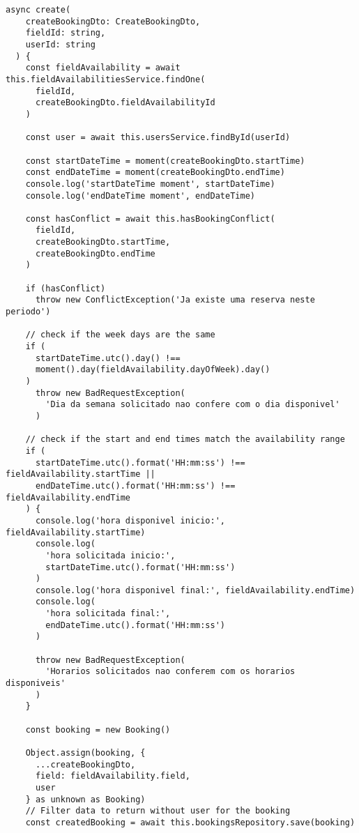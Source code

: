 \begin{lstlisting}[caption={\textit{Service} para a rota de criação de \textit{booking} (agendamento).},label={cod:create-booking-service}]
	async create(
    createBookingDto: CreateBookingDto,
    fieldId: string,
    userId: string
  ) {
    const fieldAvailability = await this.fieldAvailabilitiesService.findOne(
      fieldId,
      createBookingDto.fieldAvailabilityId
    )

    const user = await this.usersService.findById(userId)

    const startDateTime = moment(createBookingDto.startTime)
    const endDateTime = moment(createBookingDto.endTime)
    console.log('startDateTime moment', startDateTime)
    console.log('endDateTime moment', endDateTime)

    const hasConflict = await this.hasBookingConflict(
      fieldId,
      createBookingDto.startTime,
      createBookingDto.endTime
    )

    if (hasConflict)
      throw new ConflictException('Ja existe uma reserva neste periodo')

    // check if the week days are the same
    if (
      startDateTime.utc().day() !==
      moment().day(fieldAvailability.dayOfWeek).day()
    )
      throw new BadRequestException(
        'Dia da semana solicitado nao confere com o dia disponivel'
      )

    // check if the start and end times match the availability range
    if (
      startDateTime.utc().format('HH:mm:ss') !== fieldAvailability.startTime ||
      endDateTime.utc().format('HH:mm:ss') !== fieldAvailability.endTime
    ) {
      console.log('hora disponivel inicio:', fieldAvailability.startTime)
      console.log(
        'hora solicitada inicio:',
        startDateTime.utc().format('HH:mm:ss')
      )
      console.log('hora disponivel final:', fieldAvailability.endTime)
      console.log(
        'hora solicitada final:',
        endDateTime.utc().format('HH:mm:ss')
      )

      throw new BadRequestException(
        'Horarios solicitados nao conferem com os horarios disponiveis'
      )
    }

    const booking = new Booking()

    Object.assign(booking, {
      ...createBookingDto,
      field: fieldAvailability.field,
      user
    } as unknown as Booking)
    // Filter data to return without user for the booking
    const createdBooking = await this.bookingsRepository.save(booking)


\end{lstlisting}
